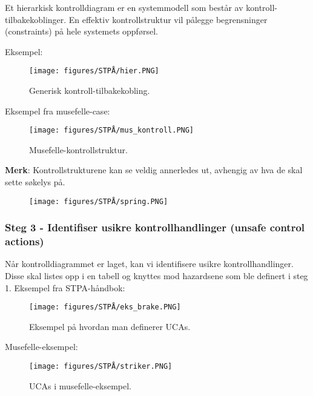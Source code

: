 Et hierarkisk kontrolldiagram er en systemmodell som består av kontroll-tilbakekoblinger. En effektiv kontrollstruktur vil pålegge begrensninger (constraints) på hele systemets oppførsel.

Eksempel:

\begin{figure}[H]
    \centering
        \texttt{[image: figures/STPÅ/hier.PNG]}\\
        \caption{Generisk kontroll-tilbakekobling.}
\end{figure}

Eksempel fra musefelle-case:

\begin{figure}[H]
    \centering
        \texttt{[image: figures/STPÅ/mus\_kontroll.PNG]}\\
        \caption{Musefelle-kontrollstruktur.}
\end{figure}

\textbf{Merk}: Kontrollstrukturene kan se veldig annerledes ut, avhengig av hva de skal sette søkelys på. 

\begin{figure}[H]
    \centering
        \texttt{[image: figures/STPÅ/spring.PNG]}\\
        
\end{figure}

\subsubsection{Steg 3 - Identifiser usikre kontrollhandlinger (unsafe control actions)}

Når kontrolldiagrammet er laget, kan vi identifisere usikre kontrollhandlinger. Disse skal listes opp i en tabell og knyttes mod hazardsene som ble definert i steg 1. Eksempel fra STPA-håndbok:


\begin{figure}[H]
    \centering
        \texttt{[image: figures/STPÅ/eks\_brake.PNG]}\\
        \caption{Eksempel på hvordan man definerer UCAs.}
\end{figure}

Musefelle-eksempel:

\begin{figure}[H]
    \centering
        \texttt{[image: figures/STPÅ/striker.PNG]}\\
        \caption{UCAs i musefelle-eksempel.}
\end{figure}


